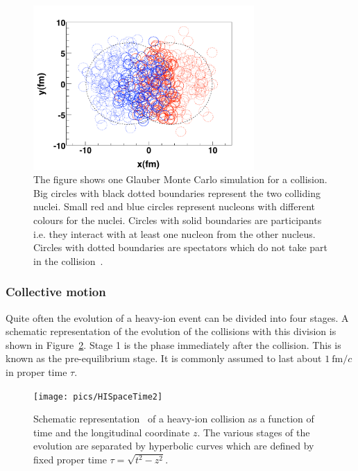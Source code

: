 \begin{figure}[htbp]
\centering
               \includegraphics[width=0.75\textwidth]{figures/test_pbpb_2a}
        \caption[The result of one Glauber Monte Carlo simulation.]{The figure shows one Glauber Monte Carlo simulation for a \PbPb collision. Big circles with black dotted boundaries represent the two colliding nuclei. Small red and blue circles represent nucleons with different colours for the nuclei. Circles with solid boundaries are participants i.e. they interact with at least one nucleon from the other nucleus. Circles with dotted boundaries are spectators which do not take part in the collision~\cite{Alver:2008aq}.}
        	\label{fig:GMC}
\end{figure}



\subsubsection{Collective motion}
\label{sec:collective}
Quite often the evolution of a heavy-ion event can be divided into four stages. A schematic representation of the evolution of the collisions with this division is shown in Figure~\ref{fig:HISpaceTime}. Stage 1 is the phase immediately after the collision. This is known as the pre-equilibrium stage. It is commonly assumed to last about $1\ \mathrm{fm}/c$ in proper time $\tau$. 

\begin{figure}[htb]
\centering
               \texttt{[image: pics/HISpaceTime2]}
        \caption[Schematic representation of a heavy-ion collision]{Schematic representation~\cite{Romatschke:2009im} of a heavy-ion collision as a function of time and the longitudinal coordinate $z$. The various stages of the evolution are separated by hyperbolic curves which are defined by fixed proper time $\tau=\sqrt{t^2-z^2}$.}
        	\label{fig:HISpaceTime}
\end{figure}

